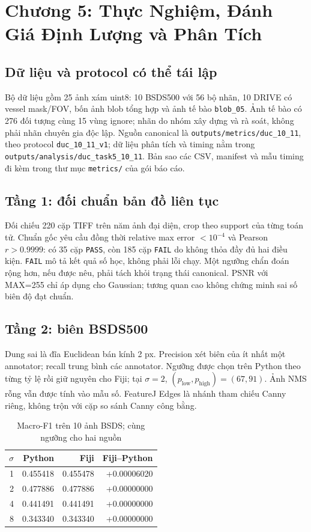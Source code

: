 \documentclass[conference]{IEEEtran}
\begin{document}


\section{Chương 5: Thực Nghiệm, Đánh Giá Định Lượng và Phân Tích}
\subsection{Dữ liệu và protocol có thể tái lập}
Bộ dữ liệu gồm 25 ảnh xám uint8: 10 BSDS500 với 56 bộ nhãn, 10 DRIVE có vessel mask/FOV, bốn ảnh blob tổng hợp và ảnh tế bào \texttt{blob\_05}. Ảnh tế bào có 276 đối tượng cùng 15 vùng ignore; nhãn do nhóm xây dựng và rà soát, không phải nhãn chuyên gia độc lập. Nguồn canonical là \texttt{outputs/metrics/duc\_10\_11}, theo protocol \texttt{duc\_10\_11\_v1}; dữ liệu phân tích và timing nằm trong \texttt{outputs/analysis/duc\_task5\_10\_11}. Bản sao các CSV, manifest và mẫu timing đi kèm trong thư mục \texttt{metrics/} của gói báo cáo.



\subsection{Tầng 1: đối chuẩn bản đồ liên tục}
Đối chiếu 220 cặp TIFF trên năm ảnh đại diện, crop theo support của từng toán tử. Chuẩn gốc yêu cầu đồng thời relative max error $<10^{-4}$ và Pearson $r>0.9999$: có 35 cặp \texttt{PASS}, còn 185 cặp \texttt{FAIL} do không thỏa đầy đủ hai điều kiện. \texttt{FAIL} mô tả kết quả số học, không phải lỗi chạy. Một ngưỡng chẩn đoán rộng hơn, nếu được nêu, phải tách khỏi trạng thái canonical. PSNR với MAX=255 chỉ áp dụng cho Gaussian; tương quan cao không chứng minh sai số biên độ đạt chuẩn.

\subsection{Tầng 2: biên BSDS500}
Dung sai là đĩa Euclidean bán kính 2 px. Precision xét biên của ít nhất một annotator; recall trung bình các annotator. Ngưỡng được chọn trên Python theo từng tỷ lệ rồi giữ nguyên cho Fiji; tại $\sigma=2$, $(p_{\mathrm{low}},p_{\mathrm{high}})=(67,91)$. Ảnh NMS rỗng vẫn được tính vào mẫu số. FeatureJ Edges là nhánh tham chiếu Canny riêng, không trộn với cặp so sánh Canny công bằng.
\begin{table}[htbp]\centering
\caption{Macro-F1 trên 10 ảnh BSDS; cùng ngưỡng cho hai nguồn}\label{tab:duc10_bsds}
\begin{tabular}{rrrr}\toprule
$\sigma$ & Python & Fiji & Fiji--Python \\\midrule
1 & 0.455418 & 0.455478 & +0.00006020 \\
2 & 0.477886 & 0.477886 & +0.00000000 \\
4 & 0.441491 & 0.441491 & +0.00000000 \\
8 & 0.343340 & 0.343340 & +0.00000000 \\
\bottomrule\end{tabular}\end{table}
\end{document}
